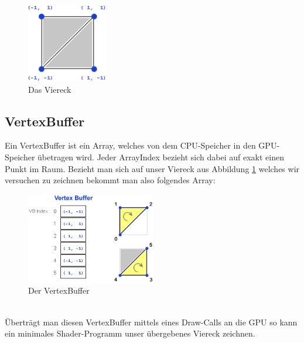 \begin{Spacing}{\mylinespace}
\begin{figure}[h!]
	\vspace*{30px}
	\centering
	\includegraphics[height=130px]{graphics/quad.png}	
	\caption{Das Viereck\protect\footnotemark}
	\label{fig:Viereck}
\end{figure}


\subsection{VertexBuffer}
Ein VertexBuffer ist ein Array, welches von dem CPU-Speicher in den GPU-Speicher übetragen wird.
Jeder ArrayIndex bezieht sich dabei auf exakt einen Punkt im Raum.
Bezieht man sich auf unser Viereck aus Abbildung \ref{fig:Viereck} welches wir versuchen zu zeichnen bekommt man also folgendes Array: \\
\begin{figure}[h!]
	\vspace*{30px}
	\centering
	\includegraphics[height=150px]{graphics/vertexbuffer.png}	
	\caption{Der VertexBuffer\protect\footnotemark}
	\label{fig:VertexBuffer}
\end{figure}
\\
Überträgt man diesen VertexBuffer mittels eines Draw-Calls an die GPU so kann ein minimales Shader-Programm unser übergebenes Viereck zeichnen.


\end{Spacing}
